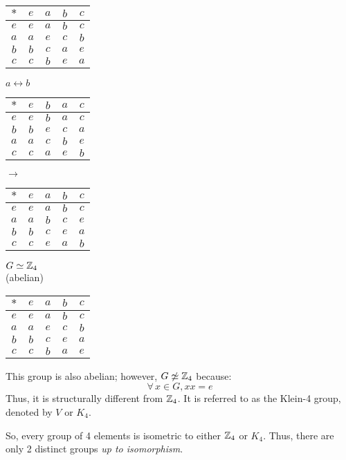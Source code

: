 \documentclass[letterpaper,12pt,fleqn]{article}
\begin{document}
\begin{minipage}{1.5in}
\begin{tabular}{c|cccc}
  $*$ & $e$ & $a$ & $b$ & $c$ \\
  \hline
  $e$ & $e$ & $a$ & $b$ & $c$ \\
  $a$ & $a$ & $e$ & $c$ & $b$ \\
  $b$ & $b$ & $c$ & $a$ & $e$ \\
  $c$ & $c$ & $b$ & $e$ & $a$ \\
\end{tabular}
\end{minipage}
\begin{minipage}{0.5in}
  $a\leftrightarrow b$
\end{minipage}
\begin{minipage}{1.5in}
\begin{tabular}{c|cccc}
  $*$ & $e$ & $b$ & $a$ & $c$ \\
  \hline
  $e$ & $e$ & $b$ & $a$ & $c$ \\
  $b$ & $b$ & $e$ & $c$ & $a$ \\
  $a$ & $a$ & $c$ & $b$ & $e$ \\
  $c$ & $c$ & $a$ & $e$ & $b$ \\
\end{tabular}
\end{minipage}
\begin{minipage}{0.5in}
  $\to$
\end{minipage}
\begin{minipage}{1.5in}
\begin{tabular}{c|cccc}
  $*$ & $e$ & $a$ & $b$ & $c$ \\
  \hline
  $e$ & $e$ & $a$ & $b$ & $c$ \\
  $a$ & $a$ & $b$ & $c$ & $e$ \\
  $b$ & $b$ & $c$ & $e$ & $a$ \\
  $c$ & $c$ & $e$ & $a$ & $b$ \\
\end{tabular}
\end{minipage}

\bigskip

$G\simeq\mathbb{Z}_4$ \\
(abelian)

\bigskip

\begin{minipage}{2in}
\begin{tabular}{c|cccc}
  $*$ & $e$ & $a$ & $b$ & $c$ \\
  \hline
  $e$ & $e$ & $a$ & $b$ & $c$ \\
  $a$ & $a$ & $e$ & $c$ & $b$ \\
  $b$ & $b$ & $c$ & $e$ & $a$ \\
  $c$ & $c$ & $b$ & $a$ & $e$ \\
\end{tabular}
\end{minipage}
\begin{minipage}{3in}
  This group is also abelian; however, $G\not\simeq\mathbb{Z}_4$ because:
  \[\forall\,x\in G,xx=e\]
  Thus, it is structurally different from $\mathbb{Z}_4$. It is referred to as the
  Klein-4 group, denoted by $V$ or $K_4$.
\end{minipage}

\bigskip

So, every group of 4 elements is isometric to either $\mathbb{Z}_4$ or $K_4$. Thus,
there are only 2 distinct groups \emph{up to isomorphism}.
\end{document}
